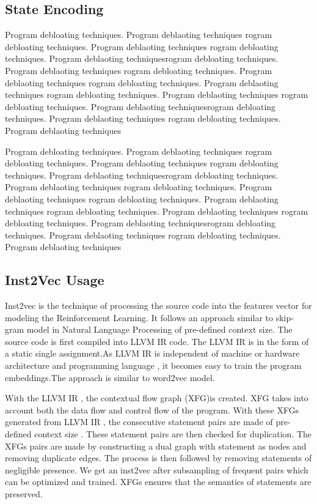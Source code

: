 \documentclass{relatorio}
\begin{document}
\subsection{State Encoding}%
\label{Tools}

Program debloating techniques. Program deblaoting techniques rogram debloating techniques. Program deblaoting techniques
rogram debloating techniques. Program deblaoting techniquesrogram debloating techniques. Program deblaoting techniques
rogram debloating techniques. Program deblaoting techniques rogram debloating techniques. Program deblaoting techniques
rogram debloating techniques. Program deblaoting techniques 
rogram debloating techniques. Program deblaoting techniquesrogram debloating techniques. Program deblaoting techniques
rogram debloating techniques. Program deblaoting techniques

Program debloating techniques. Program deblaoting techniques rogram debloating techniques. Program deblaoting techniques
rogram debloating techniques. Program deblaoting techniquesrogram debloating techniques. Program deblaoting techniques
rogram debloating techniques. Program deblaoting techniques rogram debloating techniques. Program deblaoting techniques
rogram debloating techniques. Program deblaoting techniques 
rogram debloating techniques. Program deblaoting techniquesrogram debloating techniques. Program deblaoting techniques
rogram debloating techniques. Program deblaoting techniques	

\subsection{Inst2Vec Usage}%
\label{Tools}

Inst2vec  is the technique of processing the source code into the features vector for modeling the Reinforcement Learning. It follows an approach similar to skip-gram model in Natural Language Processing of pre-defined context size. The source code is first compiled into LLVM IR code. The LLVM IR is in the form of a static single assignment.As LLVM IR  is independent of machine or hardware architecture and programming language , it becomes easy to train the program embeddings.The approach is similar to word2vec model.


With the LLVM IR , the contextual flow graph (XFG)is created. XFG takes into account both the data flow and control flow of the program. With these XFGs generated from LLVM IR , the consecutive statement pairs are made of pre-defined context size . These statement pairs are then  checked for duplication. The XFGs pairs are made by constructing a dual graph with statement as nodes and removing duplicate edges. The process is then followed by removing statements of negligible presence. We get an inst2vec after subsampling of frequent pairs which can be optimized and trained. XFGs ensures that the semantics of statements are preserved.
\end{document}
